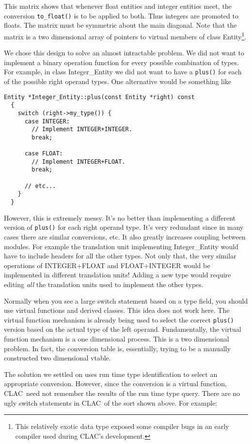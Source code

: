 \documentclass{report}
\newcommand{\CLAC}{CLAC}
\begin{document}
This matrix shows that whenever float entities and integer entities meet, the conversion \texttt{to\_float()} is to be applied to both. Thus integers are promoted to floats. The matrix must be symmetric about the main diagonal. Note that the matrix is a two dimensional array of pointers to virtual members of class Entity\footnote{This relatively exotic data type exposed some compiler bugs in an early compiler used during \CLAC's development.}.

We chose this design to solve an almost intractable problem. We did not want to implement a binary operation function for every possible combination of types. For example, in class Integer\_Entity we did not want to have a \texttt{plus()} for each of the possible right operand types. One alternative would be something like

\begin{verbatim}
Entity *Integer_Entity::plus(const Entity *right) const
  {
    switch (right->my_type()) {
      case INTEGER:
        // Implement INTEGER+INTEGER.
        break;

      case FLOAT:
        // Implement INTEGER+FLOAT.
        break;

      // etc...
    }
  }
\end{verbatim}

However, this is extremely messy. It's no better than implementing a different version of \texttt{plus()} for each right operand type. It's very redundant since in many cases there are similar conversions, etc. It also greatly increases coupling between modules. For example the translation unit implementing Integer\_Entity would have to include headers for all the other types. Not only that, the very similar operations of INTEGER+FLOAT and FLOAT+INTEGER would be implemented in different translation units! Adding a new type would require editing \emph{all} the translation units used to implement the other types.

Normally when you see a large switch statement based on a type field, you should use virtual functions and derived classes. This idea does not work here. The virtual function mechanism is already being used to select the correct \texttt{plus()} version based on the actual type of the left operand. Fundamentally, the virtual function mechanism is a one dimensional process. This is a two dimensional problem. In fact, the conversion table is, essentially, trying to be a manually constructed two dimensional vtable.

The solution we settled on uses run time type identification to select an appropriate conversion. However, since the conversion is a virtual function, \CLAC\ need not remember the results of the run time type query. There are no ugly switch statements in \CLAC\ of the sort shown above. For example:
\end{document}
